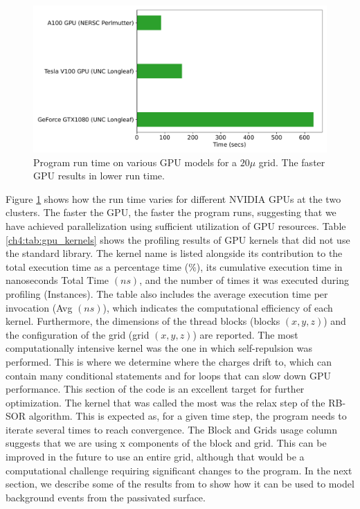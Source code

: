 \begin{figure}[!htb]
    \centering
    \includegraphics[width=0.99\linewidth]{ch4/figs/gpu_comp.pdf}
\caption{\label{ch4:fig:GPU_comp} Program run time on various GPU models for a $20\mu$ grid. The faster GPU results in lower run time.}
\end{figure}

Figure \ref{ch4:fig:GPU_comp} shows how the run time varies for different NVIDIA GPUs at the two clusters. The faster the GPU, the faster the program runs, suggesting that we have achieved parallelization using sufficient utilization of GPU resources. Table \ref{ch4:tab:gpu_kernels} shows the profiling results of GPU kernels that did not use the standard library. The kernel name is listed alongside its contribution to the total execution time as a percentage time ($\%$), its cumulative execution time in nanoseconds Total Time $(ns)$, and the number of times it was executed during profiling (Instances). The table also includes the average execution time per invocation (Avg $(ns)$), which indicates the computational efficiency of each kernel. Furthermore, the dimensions of the thread blocks (blocks $(x, y, z)$) and the configuration of the grid (grid $(x, y, z)$) are reported. The most computationally intensive kernel was the one in which self-repulsion was performed. This is where we determine where the charges drift to, which can contain many conditional statements and for loops that can slow down GPU performance. This section of the code is an excellent target for further optimization. The kernel that was called the most was the relax step of the RB-SOR algorithm. This is expected as, for a given time step, the program needs to iterate several times to reach convergence. The Block and Grids usage column suggests that we are using x components of the block and grid. This can be improved in the future to use an entire grid, although that would be a computational challenge requiring significant changes to the program. In the next section, we describe some of the results from {\ehd} to show how it can be used to model background events from the passivated surface.



